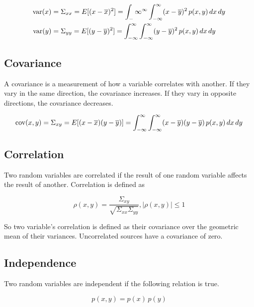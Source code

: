 \begin{align*}
  \operatorname{var}(x) &= \Sigma_{xx} = E[(x - \overline{x})^2] =
    \int_-\infty^{\infty} \int_{-\infty}^\infty (x - \overline{y})^2 \,p(x, y)
    \,dx \,dy \\
  \operatorname{var}(y) &= \Sigma_{yy} = E[(y - \overline{y})^2] =
    \int_{-\infty}^\infty \int_{-\infty}^\infty (y - \overline{y})^2 \,p(x, y)
    \,dx \,dy \\
\end{align*}

\subsection{Covariance}

A covariance is a measurement of how a variable correlates with another. If they
vary in the same direction, the covariance increases. If they vary in opposite
directions, the covariance decreases.

\begin{equation*}
  \operatorname{cov}(x, y) = \Sigma_{xy} = E[(x - \overline{x})(y - \overline{y})] =
    \int_{-\infty}^\infty \int_{-\infty}^\infty (x - \overline{y})
    (y - \overline{y}) \,p(x, y) \,dx \,dy \\
\end{equation*}

\subsection{Correlation}

Two random variables are correlated if the result of one random variable affects
the result of another. Correlation is defined as

\begin{equation*}
  \rho(x, y) = \frac{\Sigma_{xy}}{\sqrt{\Sigma_{xx}\Sigma_{yy}}}, |\rho(x, y)|
    \leq 1
\end{equation*}

So two variable's correlation is defined as their covariance over the geometric
mean of their variances. Uncorrelated sources have a covariance of zero.

\subsection{Independence}

Two random variables are independent if the following relation is true.

\begin{equation*}
  p(x, y) = p(x) \,p(y)
\end{equation*}

